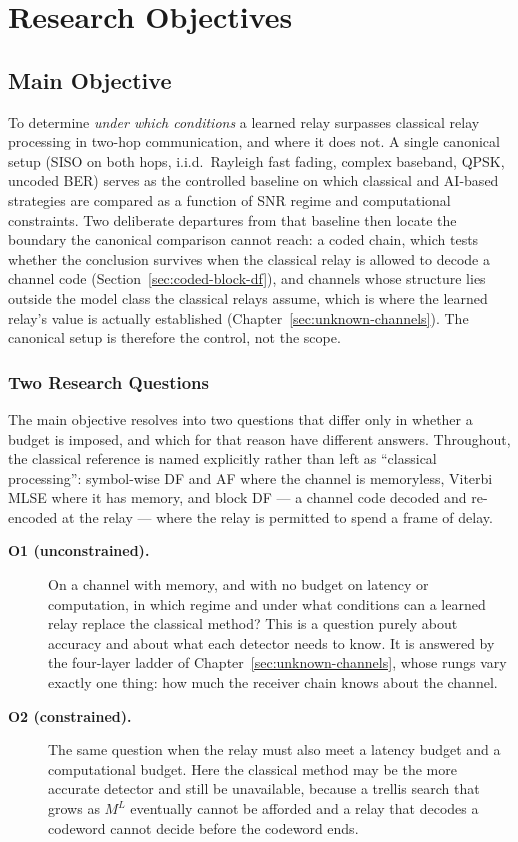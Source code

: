 \chapter{Research Objectives}\label{sec:research-objectives}

\section{Main Objective}\label{sec:main-objective}

To determine \emph{under which conditions} a learned relay surpasses classical relay processing in two-hop communication, and where it does not. A single canonical setup (SISO on both hops, i.i.d.\ Rayleigh fast fading, complex baseband, QPSK, uncoded BER) serves as the controlled baseline on which classical and AI-based strategies are compared as a function of SNR regime and computational constraints. Two deliberate departures from that baseline then locate the boundary the canonical comparison cannot reach: a coded chain, which tests whether the conclusion survives when the classical relay is allowed to decode a channel code (Section~\ref{sec:coded-block-df}), and channels whose structure lies outside the model class the classical relays assume, which is where the learned relay's value is actually established (Chapter~\ref{sec:unknown-channels}). The canonical setup is therefore the control, not the scope.

\subsection{Two Research Questions}\label{sec:two-objectives}

The main objective resolves into two questions that differ only in whether a budget is imposed, and which for that reason have different answers. Throughout, the classical reference is named explicitly rather than left as ``classical processing'': symbol-wise DF and AF where the channel is memoryless, Viterbi MLSE where it has memory, and block DF --- a channel code decoded and re-encoded at the relay --- where the relay is permitted to spend a frame of delay.

\begin{description}
\item[\textbf{O1 (unconstrained).}] On a channel with memory, and with no budget on latency or computation, in which regime and under what conditions can a learned relay replace the classical method? This is a question purely about accuracy and about what each detector needs to know. It is answered by the four-layer ladder of Chapter~\ref{sec:unknown-channels}, whose rungs vary exactly one thing: how much the receiver chain knows about the channel.

\item[\textbf{O2 (constrained).}] The same question when the relay must also meet a latency budget and a computational budget. Here the classical method may be the more accurate detector and still be unavailable, because a trellis search that grows as $M^{L}$ eventually cannot be afforded and a relay that decodes a codeword cannot decide before the codeword ends.
\end{description}

